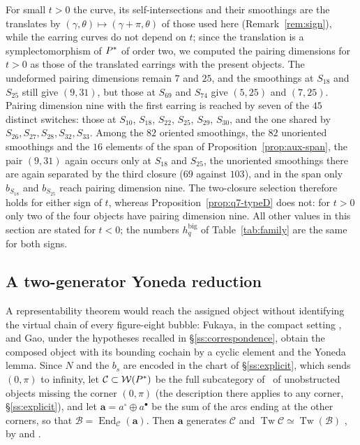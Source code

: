 \begin{remark}\label{rem:sign-pairings}
For small $t>0$ the curve, its self-intersections and their smoothings are the translates by
$(\gamma,\theta)\mapsto(\gamma+\pi,\theta)$ of those used here (Remark~\ref{rem:sign}), while the
earring curves do not depend on $t$; since the translation is a symplectomorphism of $P^{*}$ of order
two, we computed the pairing dimensions for $t>0$ as those of the translated earrings with the present
objects.  The undeformed pairing dimensions remain $7$ and $25$, and the smoothings at $S_{18}$ and $S_{25}$
still give $(9,31)$, but those at $S_{69}$ and $S_{74}$ give $(5,25)$ and $(7,25)$.  Pairing dimension nine
with the first earring is reached by seven of the $45$ distinct switches: those at $S_{10}$, $S_{18}$,
$S_{22}$, $S_{25}$, $S_{29}$, $S_{30}$, and the one shared by $S_{26},S_{27},S_{28},S_{32},S_{33}$.  Among the
$82$ oriented smoothings, the $82$ unoriented smoothings and the $16$ elements of the
span of Proposition~\ref{prop:aux-span}, the pair $(9,31)$ again occurs only at $S_{18}$ and $S_{25}$,
the unoriented smoothings there are again separated by the third closure ($69$ against $103$), and in the
span only $b_{S_{18}}$ and $b_{S_{25}}$ reach pairing dimension nine.  The two-closure selection therefore
holds for either sign of $t$, whereas Proposition~\ref{prop:q7-typeD} does not: for $t>0$ only two of the
four objects have pairing dimension nine.  All other values in this section are stated for $t<0$; the
numbers $h_q^{\mathrm{big}}$ of Table~\ref{tab:family} are the same for both signs.
\end{remark}

\subsection{A two-generator Yoneda reduction}\label{ss:yoneda}
A representability theorem would reach the assigned object without identifying the virtual chain of
every figure-eight bubble: Fukaya, in the compact setting \cite[Thms.~6.3 and~7.3]{FukayaCorr}, and
Gao, under the hypotheses recalled in \S\ref{ss:correspondence}, obtain the composed object with its
bounding cochain by a cyclic element and the Yoneda lemma.  Since $N$ and the $b_s$ are
encoded in the chart of \S\ref{ss:explicit}, which sends $(0,\pi)$ to infinity, let $\mathcal C\subset\mathcal W(P^{*})$
be the full subcategory of~\cite[\S11.5]{CHKK} of unobstructed objects missing the corner $(0,\pi)$ (the
description there applies to any corner, \S\ref{ss:explicit}), and let $\mathbf a=a^\circ\oplus a^\bullet$ be the sum of the arcs ending at
the other corners, so that $\mathcal B=\operatorname{End}_{\mathcal C}(\mathbf a)$.  Then $\mathbf a$
generates $\mathcal C$ and $\operatorname{Tw}\mathcal C\simeq\operatorname{Tw}(\mathcal B)$
\cite[\S11.5]{CHKK}, by \cite[Thm.~7.6]{Bocklandt} and \cite[\S3]{HKK}.

